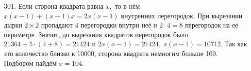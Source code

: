 301. Если сторона квадрата равна $x,$ то в нём $x(x-1)+(x-1)x=2x(x-1)$ внутренних перегородок. При вырезании дырки $2\times2$ пропадают 4 перегородки внутри неё и $2\cdot4=8$ перегородок на её периметре. Значит, до вырезания квадратов перегородок было $21364+5\cdot(4+8)=21424$ и $2x(x-1)=21424,\ x(x-1)=10712.$ Так как это количество близко к 10000, сторона квадрата немногим больше 100. Подбором найдём $x=104.$\\
